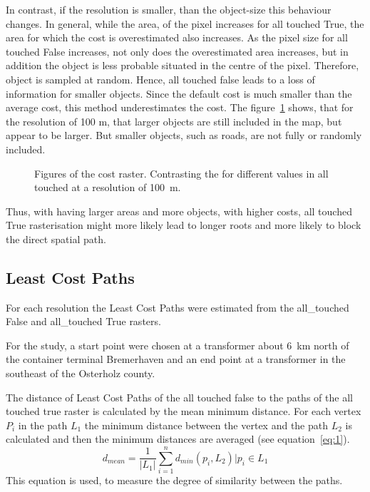 In contrast, if the resolution is smaller, than the object-size this behaviour changes.
In general, while the area, of the pixel increases for all touched True, the area for which the cost is overestimated also increases.
As the pixel size for all touched  False increases, not only does the overestimated area increases, but in addition the object is less probable situated in the centre of the pixel. 
Therefore, object is sampled at random.
Hence, all touched false leads to a loss of information for smaller objects.
 Since the default cost is much smaller than the average cost, this method underestimates the cost.
The figure~\ref{fig:costs_100m} shows, that for the resolution of 100 m, that larger objects are still included in the map, but appear to be larger.
But smaller objects, such as roads, are not fully or randomly included.
\begin{figure}
	\centering

	\qquad
	\caption{Figures of the cost raster. Contrasting the for different values in all touched at a resolution of 100~m.}
	\label{fig:costs_100m}
\end{figure}
Thus, with having larger areas and more objects, with higher costs, all touched True rasterisation might more likely lead to longer roots and more likely to block the  direct spatial path.

\subsection{Least Cost Paths}\label{subsec:least-cost-paths}
For each resolution the Least Cost Paths were estimated from the all\_touched False and all\_touched True rasters.

For the study, a start point were chosen at a transformer about 6~km north of the container terminal Bremerhaven and an end point at a transformer in the southeast of the Osterholz county. 

The distance of Least Cost Paths of the all touched false to the paths of the all touched true raster is calculated by the mean minimum distance.
For each vertex $P_i$ in the path $L_1$ the minimum distance between the vertex and the path $L_2$
is calculated and then the minimum distances are averaged (see equation~\ref{eq:1}).
\begin{equation}
	\label{eq:1}
	d_{mean} = \frac{1}{|L_1|} \sum_{i=1}^{n} d_{min}(p_i, L_2) \Bigr\vert p_i \in L_1
\end{equation}
This equation is used, to measure the degree of similarity between the paths.

